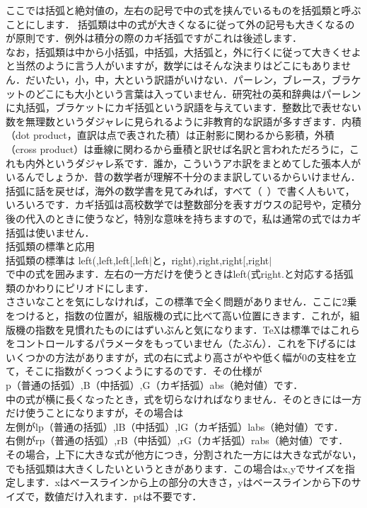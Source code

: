 \documentclass [10pt,fleqn,b5paper]{jsarticlek}
\begin{document}
{{ここでは括弧と絶対値の，左右の記号で中の式を挟んでいるものを括弧類と呼ぶことにします．
括弧類は中の式が大きくなるに従って外の記号も大きくなるのが原則です．例外は積分の際のカギ括弧ですがこれは後述します．\\
なお，括弧類は中から小括弧，中括弧，大括弧と，外に行くに従って大きくせよと当然のように言う人がいますが，数学にはそんな決まりはどこにもありません．だいたい，小，中，大という訳語がいけない．パーレン，ブレース，ブラケットのどこにも大小という言葉は入っていません．研究社の英和辞典はパーレンに丸括弧，ブラケットにカギ括弧という訳語を与えています．整数比で表せない数を無理数というダジャレに見られるように非教育的な訳語が多すぎます．内積（dot product，直訳は点で表された積）は正射影に関わるから影積，外積（cross product）は垂線に関わるから垂積と訳せば名訳と言われただろうに，これも内外というダジャレ系です．誰か，こういうアホ訳をまとめてした張本人がいるんでしょうか．昔の数学者が理解不十分のまま訳しているからいけません．
括弧に話を戻せば，海外の数学書を見てみれば，すべて（\ ）で書く人もいて，いろいろです．カギ括弧は高校数学では整数部分を表すガウスの記号や，定積分後の代入のときに使うなど，特別な意味を持ちますので，私は通常の式ではカギ括弧は使いません．\\
\kakkoichi \quad 括弧類の標準と応用\\
括弧類の標準は
\yy left(,\yy left\yy \bl,left[,left$|$と，\yy right),\yy right\yy \bl,right[,right$|$
\\で中の式を囲みます．左右の一方だけを使うときは\yy left(式\yy right.と対応する括弧類のかわりにピリオドにします．\\
ささいなことを気にしなければ，この標準で全く問題がありません．ここに2乗をつけると，指数の位置が，組版機の式に比べて高い位置にきます．これが，組版機の指数を見慣れたものにはずいぶんと気になります．TeXは標準ではこれらをコントロールするパラメータをもっていません（たぶん）．これを下げるにはいくつかの方法がありますが，式の右に式より高さがやや低く幅が0の支柱を立て，そこに指数がくっつくようにするのです．その仕様が\\
\yy p（普通の括弧）,\yy B（中括弧）,\yy G（カギ括弧）\yy abs（絶対値）です．\\
中の式が横に長くなったとき，式を切らなければなりません．そのときには一方だけ使うことになりますが，その場合は\\
左側が\yy lp（普通の括弧）,\yy lB（中括弧）,\yy lG（カギ括弧）\yy labs（絶対値）です．\\
右側が\yy rp（普通の括弧）,\yy rB（中括弧）,\yy rG（カギ括弧）\yy rabs（絶対値）です．\\
その場合，上下に大きな式が他方につき，分割された一方には大きな式がない，でも括弧類は大きくしたいというときがあります．この場合は\fa x,y\fb でサイズを指定します．xはベースラインから上の部分の大きさ，yはベースラインから下のサイズで，数値だけ入れます．ptは不要です．
}}
\end{document}
